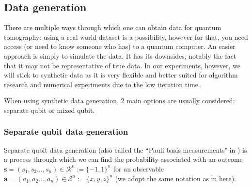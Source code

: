 \documentclass[12pt]{memoir}
\newcommand{\mb}{\mathbf}
\begin{document}
\subsection{Data generation}
There are multiple ways through which one can obtain data for quantum tomography: using a real-world dataset is a possibility, however for that, you need access (or need to know someone who has) to a quantum computer. An easier approach is simply to simulate the data. It has its downsides, notably the fact that it may not be representative of true data. In our experiments, however, we will stick to synthetic data as it is very flexible and better suited for algorithm research and numerical experiments due to the low iteration time.\medskip

When using synthetic data generation, 2 main options are usually considered: separate qubit or mixed qubit.


\subsubsection*{Separate qubit data generation}\label{section:sep-qub-dg}
Separate qubit data generation (also called the ``Pauli basis measurements" in \cite{Guta20}) is a process through which we can find the probability associated with an outcome $\mb s = (s_1, s_2 \dots, s_n) \in \mathcal{R}^n := \{-1, 1\}^n $ for an observable $\mb a = (a_1, a_2 \dots, a_n) \in \mathcal{E}^n := \{x,y,z\}^n$ (we adopt the same notation as in \cite{MA17} here).\medskip
\end{document}
